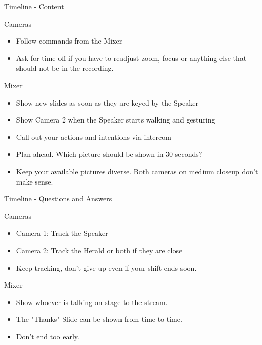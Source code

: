 \documentclass[aspectratio=169]{beamer}
\begin{document}
\begin{frame}{Timeline - Content}
	\begin{block}{Cameras}
		\begin{itemize}
			\item Follow commands from the Mixer
			\item Ask for time off if you have to readjust zoom, focus or anything else that should not be in the recording.
		\end{itemize}
	\end{block}
	
	\begin{block}{Mixer}
		\begin{itemize}
			\item Show new slides as soon as they are keyed by the Speaker 
			\item Show Camera 2 when the Speaker starts walking and gesturing
			\item Call out your actions and intentions via intercom
			\item Plan ahead. Which picture should be shown in 30 seconds?
			\item Keep your available pictures diverse. Both cameras on medium closeup don't make sense.
		\end{itemize}
	\end{block}
\end{frame}

\begin{frame}{Timeline - Questions and Answers}
	\begin{block}{Cameras}
		\begin{itemize}
			\item Camera 1: Track the Speaker
			\item Camera 2: Track the Herald or both if they are close
			\item Keep tracking, don't give up even if your shift ends soon.
		\end{itemize}
	\end{block}
	
	\begin{block}{Mixer}
		\begin{itemize}
			\item Show whoever is talking on stage to the stream.
			\item The "Thanks"-Slide can be shown from time to time.
			\item Don't end too early.
		\end{itemize}
	\end{block}
\end{frame}
\end{document}
